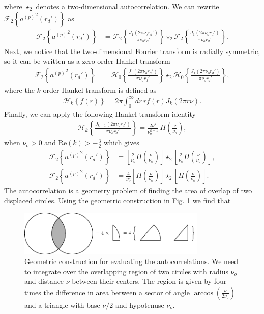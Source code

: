 \documentclass[11pt]{article}
\begin{document}
where $\star_2$ denotes a two-dimensional autocorrelation. We can rewrite
$\mathcal{F}_2\left\{{a^{(p)}}^2(r_d')\right\}$ as
\begin{align}
  \mathcal{F}_2\left\{{a^{(p)}}^2(r_d')\right\} &= \mathcal{F}_2\left\{\frac{J_1(2\pi\nu_o r_d')}{\pi\nu_o r_d'}\right\} \star_2 \mathcal{F}_2\left\{\frac{J_1(2\pi\nu_o r_d')}{\pi\nu_o r_d'}\right\}.
\end{align}
Next, we notice that the two-dimensional Fourier transform is radially
symmetric, so it can be written as a zero-order Hankel transform
\begin{align}
\mathcal{F}_2\left\{{a^{(p)}}^2(r_d')\right\} &= \mathcal{H}_0\left\{\frac{J_1(2\pi\nu_o r_d')}{\pi\nu_o r_d'}\right\} \star_2 \mathcal{H}_0\left\{\frac{J_1(2\pi\nu_o r_d')}{\pi\nu_o r_d'}\right\}, 
\end{align}
where the $k$-order Hankel transform is defined as
\begin{align}
  \mathcal{H}_k\left\{f(r)\right\} = 2\pi \int_0^\infty dr\, r f(r)J_k(2\pi r\nu).
\end{align}
Finally, we can apply the following Hankel transform identity
\begin{align}
  \mathcal{H}_{k}\left\{\frac{J_{k+1}(2\pi \nu_or_d')}{\pi\nu_o r_d'}\right\} =
  \frac{2\nu^k}{\nu_o^{k+1}}\, \Pi\left(\frac{\nu}{\nu_o}\right)\label{eq:hankstar2},
\end{align}
when $\nu_o > 0$ and $\text{Re}(k) > -\frac{3}{2}$ \cite{poul1998} which gives
\begin{align}
  \mathcal{F}_2\left\{{a^{(p)}}^2(r_d')\right\} &= \left[\frac{2}{\nu_o}\Pi\left(\frac{\nu}{\nu_o}\right)\right] \star_2 \left[\frac{2}{\nu_o}\Pi\left(\frac{\nu}{\nu_o}\right)\right],\\
  \mathcal{F}_2\left\{{a^{(p)}}^2(r_d')\right\} &= \frac{4}{\nu_o^2}\left[\Pi\left(\frac{\nu}{\nu_o}\right)\right] \star_2 \left[\Pi\left(\frac{\nu}{\nu_o}\right)\right].
\end{align}
The autocorrelation is a geometry problem of finding the area of overlap of two
displaced circles. Using the geometric construction in Fig. \ref{fig:geometry} we find that
\begin{figure}[h]
 \captionsetup{width=1.0\linewidth}
 \centering
   \centering
   \includegraphics[width = 0.8\textwidth]{../figures/geometry/geometry.pdf}
   \caption{Geometric construction for evaluating the autocorrelations. We need
     to integrate over the overlapping region of two circles with radius $\nu_o$
     and distance $\nu$ between their centers. The region is given by four times
     the difference in area between a sector of angle
     $\arccos\left(\frac{\nu}{2\nu_o}\right)$ and a triangle with base $\nu/2$
     and hypotenuse $\nu_o$.}
   \label{fig:geometry}
\end{figure}
\end{document}
